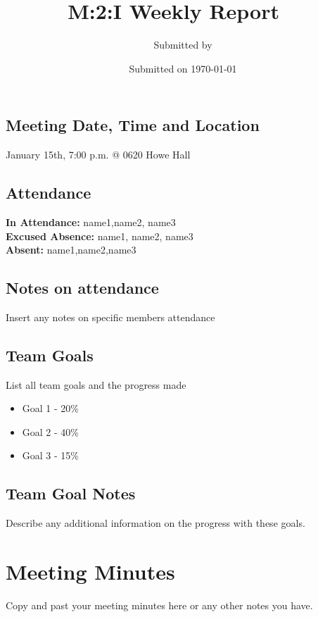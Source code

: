 \documentclass[10pt,a4paper]{article}
\author{Submitted by \teamLeader}
\title{M:2:I Weekly Report \ \\ \teamName}
\date{Submitted on \today}
\begin{document}
\maketitle
\begin{framed}
\section*{Meeting Date, Time and Location}
January 15th, 7:00 p.m. @ 0620 Howe Hall
\end{framed}
\begin{framed}
\section*{Attendance}
\textbf{In Attendance:} name1,name2, name3 \ \\
\textbf{Excused Absence:} name1, name2, name3 \ \\
\textbf{Absent:} name1,name2,name3
\subsection*{Notes on attendance}
Insert any notes on specific members attendance
\end{framed}
\begin{framed}
\section*{Team Goals}
List all team goals and the progress made
\begin{itemize}
\item Goal 1 - 20\%
\item Goal 2 - 40\%
\item Goal 3 - 15\%
\end{itemize}
\subsection*{Team Goal Notes}
Describe any additional information on the progress with these goals.
\end{framed}
\section*{Meeting Minutes}
Copy and past your meeting minutes here or any other notes you have.
\end{document}

